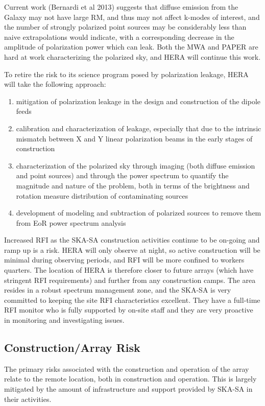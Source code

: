\documentclass[preprint]{aastex}
\begin{document}
% 
Current work (Bernardi et al 2013) suggests that diffuse emission from the Galaxy may not have large RM, and thus may not affect k-modes of interest, and the number of strongly polarized point sources may be considerably less than naive extrapolations would indicate, with a corresponding  decrease in the amplitude of polarization power which can leak.  Both the MWA and PAPER are hard at work characterizing the polarized sky, and HERA will continue this work.  

To retire the risk to its science program posed by polarization leakage, HERA will take the following approach:
\begin{enumerate}
\item mitigation of polarization leakage in the design and construction of the dipole feeds
\item calibration and characterization of leakage, especially that due to the intrinsic mismatch between X and Y linear polarization beams in the early stages of construction
\item characterization of the polarized sky through imaging (both diffuse emission and point sources) and through the power spectrum to quantify the magnitude and nature of the problem, both in terms of the brightness and rotation measure distribution of contaminating sources
\item development of modeling and subtraction of polarized sources to remove them from EoR power spectrum analysis
\end{enumerate}


Increased RFI as the SKA-SA construction activities continue to be on-going and 
ramp up is a risk.  HERA will only observe at night, so active construction will be
minimal during observing periods, and RFI will be more confined to workers quarters.
The location of HERA is therefore closer to future arrays (which have stringent
RFI requirements) and further from any construction camps.  The area resides in
a robust spectrum management zone, and the SKA-SA is very committed to
keeping the site RFI characteristics excellent.  They have a full-time RFI monitor
who is fully supported by on-site staff and they are very proactive in monitoring
and investigating issues.

\subsection{Construction/Array Risk}
The primary risks associated with the construction and operation of the array relate
to the remote location, both in construction and operation. This is largely mitigated
by the amount of infrastructure and support provided by SKA-SA in their activities.
\end{document}
